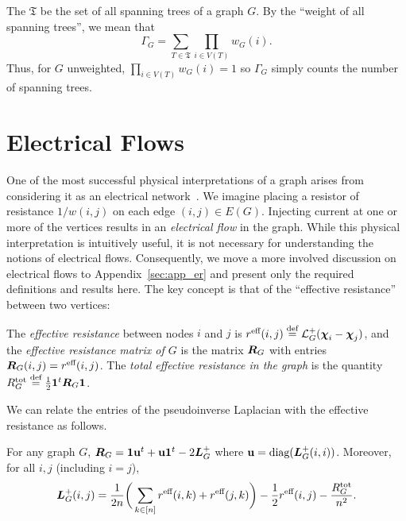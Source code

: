 \begin{remark}
	The  $\mathfrak{T}$ be the set of all spanning trees of a graph $G$. By the ``weight of all spanning trees'', we mean that
	\begin{equation}
	\label{eq:Gamma_G}
	\Gamma_G = \sum_{T\in \mathfrak{T}} \prod_{i\in  V(T)} w_G(i).
	\end{equation}
	Thus, for $G$ unweighted, $\prod_{i\in V(T)}w_G(i)=1$ so $\Gamma_G$ simply counts the number of spanning trees. 
\end{remark}




\section{Electrical Flows}
\label{sec:background_er}

One of  the most successful physical interpretations of a graph arises from considering it as an electrical network~\cite{ellens2011effective,tetali1991random}. 
We imagine placing a resistor of resistance $1/w(i,j)$ on each edge $(i,j)\in E(G)$. Injecting current at one or more of the vertices results in an \emph{electrical flow} in the graph. While this physical interpretation  is intuitively useful, it is  not necessary for understanding  the notions of electrical flows. Consequently, we move a more involved discussion on electrical flows to Appendix~\ref{sec:app_er} and present only the required definitions  and results here. The key concept is that of the ``effective resistance'' between  two vertices:  


\begin{definition}
	\label{def:effective_resistance}
	The \emph{effective resistance} between nodes $i$ and $j$ is $r^{\text{eff}}(i,j) \overset{\text{def}}{=} \mathcal{L}_G^+(\boldsymbol{\chi}_i-\boldsymbol{\chi}_j)$, and the \emph{effective resistance matrix of $G$} is the matrix $\vb*{R}_G$ with entries $\vb*{R}_G(i,j)=r^{\text{eff}}(i,j)$. The \emph{total effective resistance in the graph } is the quantity $R^{\textnormal{tot}}_G\overset{\text{def}}{=} \frac{1}{2}\vb{1}^t\vb*{R}_G\vb{1}$. 
\end{definition}

We can relate the entries of the pseudoinverse Laplacian with the effective resistance as follows.
\begin{lemma}
	\label{lem:er_props}
	For any graph $G$, $\vb*{R}_G = \vb{1} \vb{u} ^t + \vb{u}\vb{1}^t - 2\vb*{L}_G^+$ where $\vb{u}=\text{diag}(\vb*{L}_G^+(i,i))$. Moreover, for all $i,j$ (including $i=j$), 
	\begin{equation}
	\label{eq:L^+(i,j)}
	\vb*{L}_G^+(i,j) = \frac{1}{2n}\bigg(\sum_{k\in[n]}r^{\text{eff}}(i,k)+r^{\text{eff}}(j,k)\bigg) - \frac{1}{2}r^{\text{eff}}(i,j) -\frac{R^{\textnormal{tot}}_G}{n^2}.
	\end{equation}
\end{lemma}




